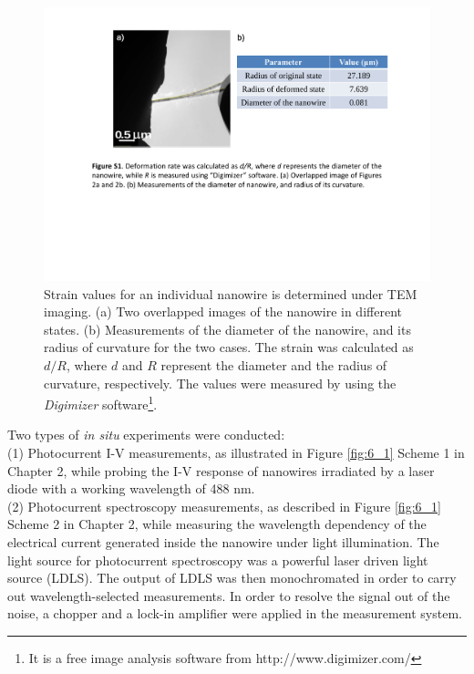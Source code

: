 \begin{figure}  [t]
\centering
\includegraphics[height=\textwidth,angle=-90]{figures/figure6_s2}
\caption[Strain value]
{Strain values for an individual nanowire is determined under TEM imaging. 
(a) Two overlapped images of the nanowire in different states. 
(b) Measurements of the diameter of the nanowire, and its radius of curvature for the two cases. The strain was calculated as $d/R$, where $d$ and $R$ represent the diameter and the radius of curvature, respectively. The values were measured by using the {\em Digimizer} software\footnote{It is a free image analysis software from http://www.digimizer.com/}.
\label{fig:6_s2}}
\end{figure}

Two types of {\it in situ} experiments were conducted:\\
(1) Photocurrent I-V measurements, as illustrated in Figure \ref{fig:6_1} Scheme 1 in Chapter 2, while probing the I-V response of nanowires irradiated by a laser diode with a working wavelength of 488 nm. \\

(2) Photocurrent spectroscopy measurements, as described in Figure \ref{fig:6_1} Scheme 2 in Chapter 2, while measuring the wavelength dependency of the electrical current generated inside the nanowire under light illumination. 
The light source for photocurrent spectroscopy was a powerful laser driven light source (LDLS). The output of LDLS was then monochromated in order to carry out wavelength-selected measurements. 
In order to resolve the signal out of the noise, a chopper and a lock-in amplifier were applied in the measurement system. \\

